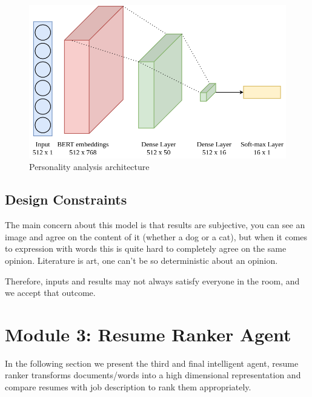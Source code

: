 \begin{figure}[h!]
\centering
\includegraphics[width=1\textwidth]{images/personality_arch.png}
\caption{Personality analysis architecture}
\label{fig:personality_arch}
\end{figure}

\subsection{Design Constraints}
The main concern about this model is that results are subjective, you can see an image and agree on the content of it (whether a dog or a cat), but when it comes to expression with words this is quite hard to completely agree on the same opinion. Literature is art, one can't be so deterministic about an opinion.

Therefore, inputs and results may not always satisfy everyone in the room, and we accept that outcome.












\newpage
\section{Module 3: Resume Ranker Agent}
\label{sec:module_3}
In the following section we present the third and final intelligent agent, resume ranker transforms documents/words into a high dimensional representation and compare resumes with job description to rank them appropriately.

